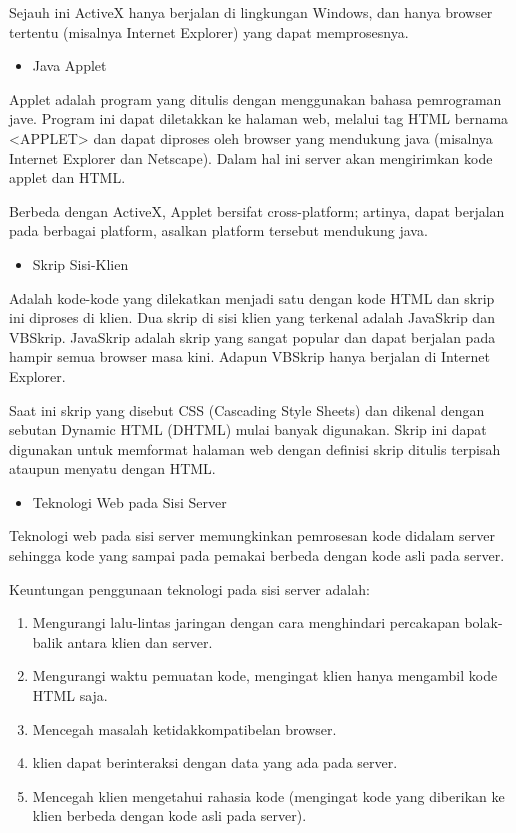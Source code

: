 \documentclass[11pt]{article}
\begin{document}
Sejauh ini ActiveX hanya berjalan di lingkungan Windows, dan hanya browser tertentu (misalnya Internet Explorer) yang dapat memprosesnya.

\begin{itemize}
	\item Java Applet
\end{itemize}

Applet adalah program yang ditulis dengan menggunakan bahasa pemrograman jave. Program ini dapat diletakkan ke halaman web, melalui tag HTML bernama <APPLET> dan dapat diproses oleh browser yang mendukung java (misalnya Internet Explorer dan Netscape). Dalam hal ini server akan mengirimkan kode applet dan HTML.

Berbeda dengan ActiveX, Applet bersifat cross-platform; artinya, dapat berjalan pada berbagai platform, asalkan platform tersebut mendukung java.


\begin{itemize}
	\item Skrip Sisi-Klien
\end{itemize}

Adalah kode-kode yang dilekatkan menjadi satu dengan kode HTML dan skrip ini diproses di klien. Dua skrip di sisi klien yang terkenal adalah JavaSkrip dan VBSkrip. JavaSkrip adalah skrip yang sangat popular dan dapat berjalan pada hampir semua browser masa kini. Adapun VBSkrip hanya berjalan di Internet Explorer.

Saat ini skrip yang disebut CSS (Cascading Style Sheets) dan dikenal dengan sebutan Dynamic HTML (DHTML) mulai banyak digunakan. Skrip ini dapat digunakan untuk memformat halaman web dengan definisi skrip ditulis terpisah ataupun menyatu dengan HTML.


\begin{itemize}
	\item Teknologi Web pada Sisi Server
\end{itemize}

Teknologi web pada sisi server memungkinkan pemrosesan kode didalam server sehingga kode yang sampai pada pemakai berbeda dengan kode asli pada server.

Keuntungan penggunaan teknologi pada sisi server adalah:


\begin{enumerate}
	\item Mengurangi lalu-lintas jaringan dengan cara menghindari percakapan bolak-balik antara klien dan server.
	\item Mengurangi waktu pemuatan kode, mengingat klien hanya mengambil kode HTML saja.
	\item Mencegah masalah ketidakkompatibelan browser.
	\item klien dapat berinteraksi dengan data yang ada pada server.
	\item Mencegah klien mengetahui rahasia kode (mengingat kode yang diberikan ke klien berbeda dengan kode asli pada server).
\end{enumerate}
\end{document}
